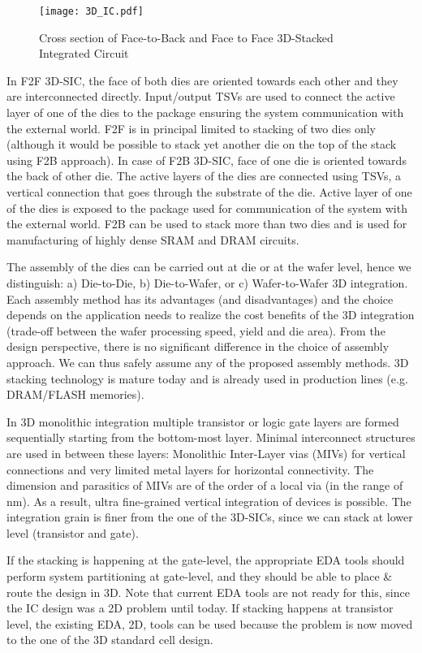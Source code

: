 \begin{figure}[h!]%
\centering
\texttt{[image: 3D\_IC.pdf]}
\caption{Cross section of Face-to-Back and Face to Face 3D-Stacked Integrated Circuit\label{fig:3D-Stacking}}
\end{figure}

In F2F 3D-SIC, the face of both dies are oriented towards each other and they are interconnected directly. Input/output TSVs are used to connect the active layer of one of the dies to the package ensuring the system communication with the external world. F2F is in principal limited to stacking of two dies only (although it would be possible to stack yet another die on the top of the stack using F2B approach). In case of F2B 3D-SIC, face of one die is oriented towards the back of other die. The active layers of the dies are connected using TSVs, a vertical connection that goes through the substrate of the die. Active layer of one of the dies is exposed to the package used for communication of the system with the external world. F2B can be used to stack more than two dies and is used for manufacturing of highly dense SRAM and DRAM circuits.

The assembly of the dies can be carried out at die or at the wafer level, hence we distinguish: a) Die-to-Die, b) Die-to-Wafer, or c) Wafer-to-Wafer 3D integration. Each assembly method has its advantages (and disadvantages) and the choice depends on the application needs to realize the cost benefits of the 3D integration (trade-off between the wafer processing speed, yield and die area). From the design perspective, there is no significant difference in the choice of assembly approach. We can thus safely assume any of the proposed assembly methods. 3D stacking technology is mature today and is already used in production lines (e.g. DRAM/FLASH memories).

In 3D monolithic integration multiple transistor or logic gate layers are formed sequentially starting from the bottom-most layer. Minimal interconnect structures are used in between these layers: Monolithic Inter-Layer vias (MIVs) for vertical connections and very limited metal layers for horizontal connectivity. The dimension and parasitics of MIVs are of the order of a local via (in the range of nm). As a result, ultra fine-grained vertical integration of devices is possible. The integration grain is finer from the one of the 3D-SICs, since we can stack at lower level (transistor and gate).

If the stacking is happening at the gate-level, the appropriate EDA tools should perform system partitioning at gate-level, and they should be able to place \& route the design in 3D. Note that current EDA tools are not ready for this, since the IC design was a 2D problem until today. If stacking happens at transistor level, the existing EDA, 2D, tools can be used because the problem is now moved to the one of the 3D standard cell design.

